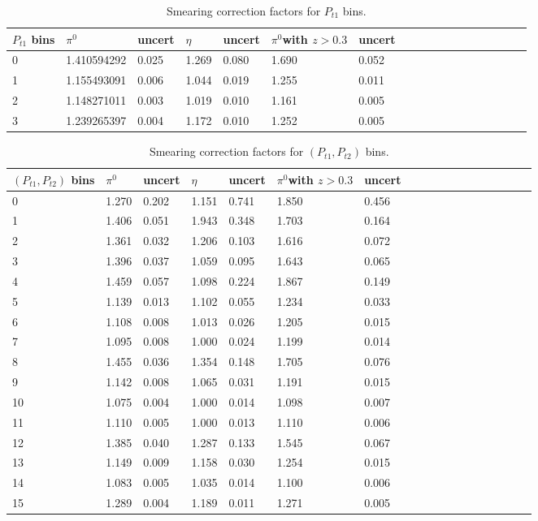 \begin{table}[H]\footnotesize
\centering
\begin{tabular}{|l|l|l|l|l|l|l|l|l|l|l|l|l|l|l|l|l|l|}
\\ \hline
$P_{t1}$ bins & $\pi^0$ &uncert  & $\eta$  & uncert & $\pi^0$\scriptsize{with $z>0.3$} &  uncert\\ \hline
0	&	1.410594292	&	0.025	&	1.269	&	0.080	&	1.690	&	0.052	\\ \hline
1	&	1.155493091	&	0.006	&	1.044	&	0.019	&	1.255	&	0.011	\\ \hline
2	&	1.148271011	&	0.003	&	1.019	&	0.010	&	1.161	&	0.005	\\ \hline
3	&	1.239265397	&	0.004	&	1.172	&	0.010	&	1.252	&	0.005	\\ \hline
\end{tabular}
\caption{Smearing correction factors for $P_{t1}$ bins.}
\label{tab:sinpt_smearing_info}
\end{table}

\begin{table}[H]\footnotesize
\centering
\begin{tabular}{|l|l|l|l|l|l|l|l|l|l|l|l|l|l|l|l|l|l|}
\\ \hline
$(P_{t1},P_{t2})$ bins & $\pi^0$ & uncert & $\eta$  &  uncert& $\pi^0$\scriptsize{with $z>0.3$} &  uncert\\ \hline
0	&	1.270	&	0.202	&	1.151	&	0.741	&	1.850	&	0.456	\\ \hline
1	&	1.406	&	0.051	&	1.943	&	0.348	&	1.703	&	0.164	\\ \hline
2	&	1.361	&	0.032	&	1.206	&	0.103	&	1.616	&	0.072	\\ \hline
3	&	1.396	&	0.037	&	1.059	&	0.095	&	1.643	&	0.065	\\ \hline
4	&	1.459	&	0.057	&	1.098	&	0.224	&	1.867	&	0.149	\\ \hline
5	&	1.139	&	0.013	&	1.102	&	0.055	&	1.234	&	0.033	\\ \hline
6	&	1.108	&	0.008	&	1.013	&	0.026	&	1.205	&	0.015	\\ \hline
7	&	1.095	&	0.008	&	1.000	&	0.024	&	1.199	&	0.014	\\ \hline
8	&	1.455	&	0.036	&	1.354	&	0.148	&	1.705	&	0.076	\\ \hline
9	&	1.142	&	0.008	&	1.065	&	0.031	&	1.191	&	0.015	\\ \hline
10	&	1.075	&	0.004	&	1.000	&	0.014	&	1.098	&	0.007	\\ \hline
11	&	1.110	&	0.005	&	1.000	&	0.013	&	1.110	&	0.006	\\ \hline
12	&	1.385	&	0.040	&	1.287	&	0.133	&	1.545	&	0.067	\\ \hline
13	&	1.149	&	0.009	&	1.158	&	0.030	&	1.254	&	0.015	\\ \hline
14	&	1.083	&	0.005	&	1.035	&	0.014	&	1.100	&	0.006	\\ \hline
15	&	1.289	&	0.004	&	1.189	&	0.011	&	1.271	&	0.005	\\ \hline
\end{tabular}
\caption{Smearing correction factors for $(P_{t1},P_{t2})$ bins.}
\label{tab:compt_smearing_info}
\end{table}

